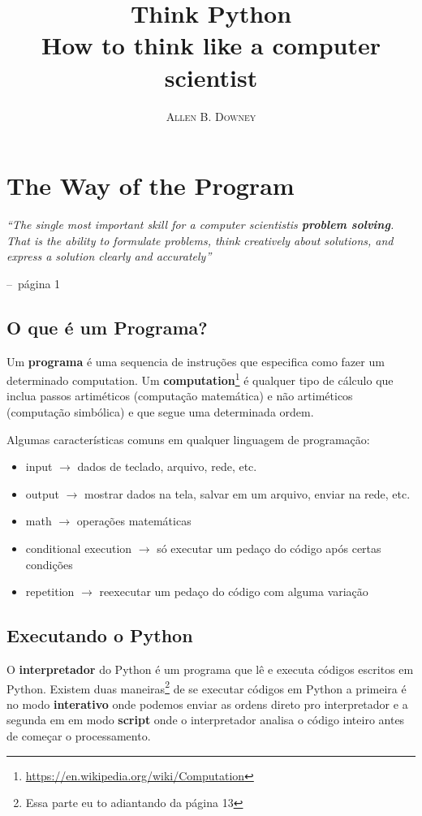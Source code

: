 \documentclass[a4paper,11pt]{book}
\title{\Huge \textbf{Think Python}  \\ \huge How to think like a computer scientist }
\author{\textsc{Allen B. Downey}}
\makeatletter
\newenvironment{chapquote}[2][2em]
  {\setlength{\@tempdima}{#1}%
   \def\chapquote@author{#2}%
   \parshape 1 \@tempdima \dimexpr\textwidth-2\@tempdima\relax%
   \itshape}
  {\par\normalfont\hfill--\ \chapquote@author\hspace*{\@tempdima}\par\bigskip}
\makeatother
\begin{document}
\frontmatter
\maketitle

\tableofcontents

\mainmatter

\chapter{The Way of the Program}

\begin{chapquote}{página 1}
	``The single most important skill for a computer scientistis \textbf{problem solving}. That is the 
	ability to formulate problems, think creatively about solutions, and express a solution clearly and 
	accurately''
\end{chapquote}

\section{O que é um Programa?}
Um \textbf{programa} é uma sequencia de instruções que especifica como fazer um determinado computation. Um \textbf{computation}\footnote{\href{https://en.wikipedia.org/wiki/Computation}{https://en.wikipedia.org/wiki/Computation}} é qualquer tipo de cálculo que inclua 
passos artiméticos (computação matemática) e não artiméticos (computação simbólica) e que segue uma determinada ordem.


Algumas características comuns em qualquer linguagem de programação:
\begin{itemize}
	\item input $\rightarrow$ dados de teclado, arquivo, rede, etc.
	\item output $\rightarrow$ mostrar dados na tela, salvar em um arquivo, enviar na rede, etc.
	\item math $\rightarrow$ operações matemáticas
	\item conditional execution $\rightarrow$ só executar um pedaço do código após certas condições
	\item repetition $\rightarrow$ reexecutar um pedaço do código com alguma variação
\end{itemize}

\section{Executando o Python}
O \textbf{interpretador} do Python é um programa que lê e executa códigos escritos em Python. Existem duas maneiras\footnote{Essa parte eu to adiantando da página 13} de se executar códigos em Python
a primeira é no modo \textbf{interativo} onde podemos enviar as ordens direto pro interpretador e a segunda em em modo \textbf{script} onde
o interpretador analisa o código inteiro antes de começar o processamento.
\end{document}

